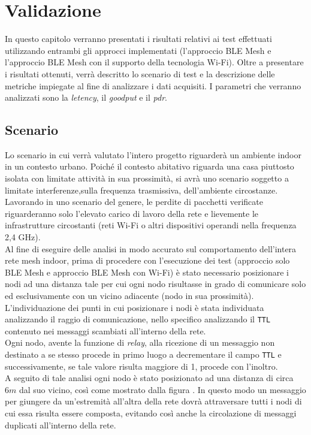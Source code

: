 \chapter{Validazione}
\label{ch:validazione}

In questo capitolo verranno presentati i risultati relativi ai test effettuati utilizzando entrambi gli approcci implementati (l'approccio BLE Mesh e l'approccio BLE Mesh con il supporto della tecnologia Wi-Fi). Oltre a presentare i risultati ottenuti, verrà descritto lo scenario di test e la descrizione delle metriche impiegate al fine di analizzare i dati acquisiti. I parametri che verranno analizzati sono la \textit{letency}, il \textit{goodput} e il \textit{pdr}.

\section{Scenario}
Lo scenario in cui verrà valutato l'intero progetto riguarderà un ambiente indoor in un contesto urbano. Poiché il contesto abitativo riguarda una casa piuttosto isolata con limitate attività in sua prossimità, si avrà uno scenario soggetto a limitate interferenze,sulla frequenza trasmissiva, dell'ambiente circostanze. Lavorando in uno scenario del genere, le perdite di pacchetti verificate riguarderanno solo l'elevato carico di lavoro della rete e lievemente le infrastrutture circostanti (reti Wi-Fi o altri dispositivi operandi nella frequenza 2,4 GHz).\\

\noindent Al fine di eseguire delle analisi in modo accurato sul comportamento dell'intera rete mesh indoor, prima di procedere con l'esecuzione dei test (approccio solo BLE Mesh e approccio BLE Mesh con Wi-Fi) è stato necessario posizionare i nodi ad una distanza tale per cui ogni nodo risultasse in grado di comunicare solo ed esclusivamente con un vicino adiacente (nodo in sua prossimità). L'individuazione dei punti in cui posizionare i nodi è stata individuata analizzando il raggio di comunicazione, nello specifico analizzando il \texttt{TTL} contenuto nei messaggi scambiati all'interno della rete.\\ 
Ogni nodo, avente la funzione di \textit{relay}, alla ricezione di un messaggio non destinato a se stesso procede in primo luogo a decrementare il campo \texttt{TTL} e successivamente, se tale valore risulta maggiore di 1, procede con l'inoltro.\\
A seguito di tale analisi ogni nodo è stato posizionato ad una distanza di circa $6m$ dal suo vicino, così come mostrato dalla figura . In questo modo un messaggio per giungere da un'estremità all'altra della rete dovrà attraversare tutti i nodi di cui essa risulta essere composta, evitando così anche la circolazione di messaggi duplicati all'interno della rete.

